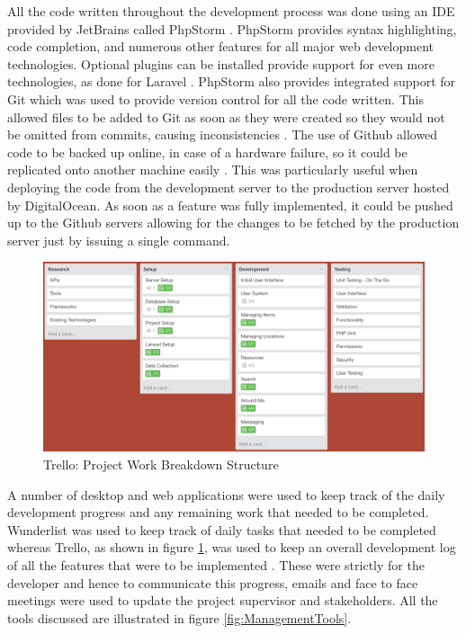 All the code written throughout the development process was done using an IDE provided by JetBrains called PhpStorm \cite{JetBrains:PHPStorm}. PhpStorm provides syntax highlighting, code completion, and numerous other features for all major web development technologies. Optional plugins can be installed provide support for even more technologies, as done for Laravel \cite{JetBrains:PHPStorm}. PhpStorm also provides integrated support for Git which was used to provide version control for all the code written. This allowed files to be added to Git as soon as they were created so they would not be omitted from commits, causing inconsistencies \cite{JetBrains:PHPStorm}. The use of Github allowed code to be backed up online, in case of a hardware failure, so it could be replicated onto another machine easily \cite{Github:Home}. This was particularly useful when deploying the code from the development server to the production server hosted by DigitalOcean\cite{DigitalOcean:Home}. As soon as a feature was fully implemented, it could be pushed up to the Github servers allowing for the changes to be fetched by the production server just by issuing a single command. 

\begin{figure}[H]
	\centering
	\includegraphics[width=1.0\textwidth]{images/Trello}
	\caption{Trello: Project Work Breakdown Structure} \label{fig:Trello_WBS}
\end{figure}

A number of desktop and web applications were used to keep track of the daily development progress and any remaining work that needed to be completed. Wunderlist was used to keep track of daily tasks that needed to be completed whereas Trello, as shown in figure \ref{fig:Trello_WBS}, was used to keep an overall development log of all the features that were to be implemented \cite{Wunderlist:Home, Trello:Home}. These were strictly for the developer and hence to communicate this progress, emails and face to face meetings were used to update the project supervisor and stakeholders. All the tools discussed are illustrated in figure \ref{fig:ManagementTools}.

